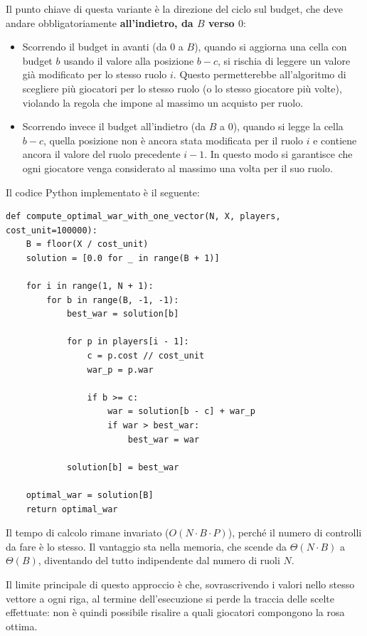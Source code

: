 Il punto chiave di questa variante è la direzione del ciclo sul budget, che deve andare obbligatoriamente \textbf{all'indietro, da $B$ verso $0$}:
\begin{itemize}
	\item Scorrendo il budget in avanti (da $0$ a $B$), quando si aggiorna una cella con budget $b$ usando il valore alla posizione $b - c$, si rischia di leggere un valore già modificato per lo stesso ruolo $i$. Questo permetterebbe all'algoritmo di scegliere più giocatori per lo stesso ruolo (o lo stesso giocatore più volte), violando la regola che impone al massimo un acquisto per ruolo.
	\item Scorrendo invece il budget all'indietro (da $B$ a $0$), quando si legge la cella $b - c$, quella posizione non è ancora stata modificata per il ruolo $i$ e contiene ancora il valore del ruolo precedente $i-1$. In questo modo si garantisce che ogni giocatore venga considerato al massimo una volta per il suo ruolo.
\end{itemize}

Il codice Python implementato è il seguente:

\noindent\begin{minipage}{\linewidth}
\begin{lstlisting}
def compute_optimal_war_with_one_vector(N, X, players, cost_unit=100000):
    B = floor(X / cost_unit)
    solution = [0.0 for _ in range(B + 1)]

    for i in range(1, N + 1):
        for b in range(B, -1, -1):
            best_war = solution[b]

            for p in players[i - 1]:
                c = p.cost // cost_unit
                war_p = p.war

                if b >= c:
                    war = solution[b - c] + war_p
                    if war > best_war:
                        best_war = war

            solution[b] = best_war

    optimal_war = solution[B]
    return optimal_war
\end{lstlisting}
\end{minipage}

Il tempo di calcolo rimane invariato ($O(N \cdot B \cdot P)$), perché il numero di controlli da fare è lo stesso. Il vantaggio sta nella memoria, che scende da $\Theta(N \cdot B)$ a \textbf{$\Theta(B)$}, diventando del tutto indipendente dal numero di ruoli $N$.

Il limite principale di questo approccio è che, sovrascrivendo i valori nello stesso vettore a ogni riga, al termine dell'esecuzione si perde la traccia delle scelte effettuate: non è quindi possibile risalire a quali giocatori compongono la rosa ottima.


